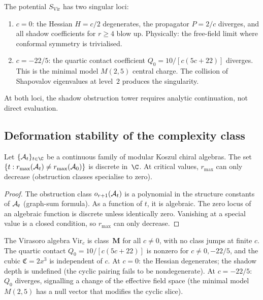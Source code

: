 \begin{remark}
\label{rem:thqg-singular-loci}
The potential $S_{\mathrm{Vir}}$ has two singular loci:
\begin{enumerate}[label=\textup{(\alph*)}]
\item $c = 0$: the Hessian $H = c/2$ degenerates, the
 propagator $P = 2/c$ diverges, and all shadow coefficients
 for $r \geq 4$ blow up. Physically: the free-field
 limit where conformal symmetry is trivialised.
\item $c = -22/5$: the quartic contact coefficient
 $Q_0 = 10/[c(5c+22)]$ diverges. This is the minimal
 model $M(2,5)$ central charge. The collision of Shapovalov
 eigenvalues at level~$2$ produces the singularity.
\end{enumerate}
At both loci, the shadow obstruction tower requires analytic continuation,
not direct evaluation.
\end{remark}



\subsection{Deformation stability of the complexity class}
\label{subsec:thqg-deformation-stability}

\begin{proposition}
\label{prop:thqg-generic-constancy}
\ClaimStatusProvedHere
{}
Let $\{\cA_t\}_{t \in \C}$ be a continuous family of modular
Koszul chiral algebras. The set
$\{t : r_{\max}(\mathcal{A}_t) \neq r_{\max}(\mathcal{A}_0)\}$ is discrete
in~$\C$. At critical values, $r_{\max}$ can only decrease
\textup{(}obstruction classes specialise to zero\textup{)}.
\end{proposition}

\begin{proof}
The obstruction class $o_{r+1}(\mathcal{A}_t)$ is a polynomial in
the structure constants of $\mathcal{A}_t$ (graph-sum formula). As
a function of $t$, it is algebraic. The zero locus of an
algebraic function is discrete unless identically zero.
Vanishing at a special value is a closed condition, so
$r_{\max}$ can only decrease.
\end{proof}

\begin{example}
\label{ex:thqg-virasoro-class-jumps}
The Virasoro algebra $\mathrm{Vir}_c$ is class~$\mathbf{M}$
for all $c \neq 0$, with no class jumps at finite $c$.
The quartic contact $Q_0 = 10/[c(5c+22)]$ is nonzero for
$c \neq 0, -22/5$, and the cubic $\mathfrak{C} = 2x^3$ is
independent of $c$. At $c = 0$: the Hessian degenerates;
the shadow depth is undefined (the cyclic pairing fails to
be nondegenerate). At $c = -22/5$: $Q_0$ diverges, signalling
a change of the effective field space (the minimal model
$M(2,5)$ has a null vector that modifies the cyclic slice).
\end{example}

